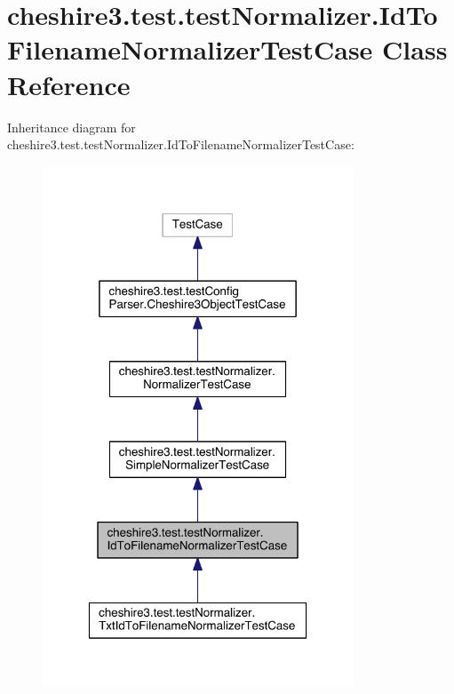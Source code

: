 \hypertarget{classcheshire3_1_1test_1_1test_normalizer_1_1_id_to_filename_normalizer_test_case}{\section{cheshire3.\-test.\-test\-Normalizer.\-Id\-To\-Filename\-Normalizer\-Test\-Case Class Reference}
\label{classcheshire3_1_1test_1_1test_normalizer_1_1_id_to_filename_normalizer_test_case}
}


Inheritance diagram for cheshire3.\-test.\-test\-Normalizer.\-Id\-To\-Filename\-Normalizer\-Test\-Case\-:
\nopagebreak
\begin{figure}[H]
\begin{center}
\leavevmode
\includegraphics[width=262pt]{classcheshire3_1_1test_1_1test_normalizer_1_1_id_to_filename_normalizer_test_case__inherit__graph}
\end{center}
\end{figure}


